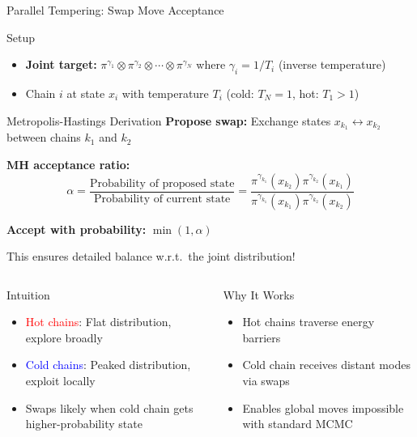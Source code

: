 \documentclass[aspectratio=169]{beamer}
\begin{document}
\begin{frame}{Parallel Tempering: Swap Move Acceptance}

	\begin{block}{Setup}
		\begin{itemize}
			\item \textbf{Joint target:} $\pi^{\gamma_1} \otimes \pi^{\gamma_2} \otimes \cdots \otimes \pi^{\gamma_N}$ where $\gamma_i = 1/T_i$ (inverse temperature)
			\item Chain $i$ at state $x_i$ with temperature $T_i$ (cold: $T_N=1$, hot: $T_1 > 1$)
		\end{itemize}
	\end{block}

	\begin{block}{Metropolis-Hastings Derivation}
		\textbf{Propose swap:} Exchange states $x_{k_1} \leftrightarrow x_{k_2}$ between chains $k_1$ and $k_2$

		\textbf{MH acceptance ratio:}
		$$\alpha = \frac{\text{Probability of proposed state}}{\text{Probability of current state}} = \frac{\pi^{\gamma_{k_1}}(x_{k_2})\pi^{\gamma_{k_2}}(x_{k_1})}{\pi^{\gamma_{k_1}}(x_{k_1})\pi^{\gamma_{k_2}}(x_{k_2})}$$

		\textbf{Accept with probability:} $\min(1, \alpha)$

		This ensures detailed balance w.r.t.\ the joint distribution!
	\end{block}

	\begin{columns}[t]
		\begin{column}{0.48\textwidth}
			\begin{block}{Intuition}
				\begin{itemize}
					\item \textcolor{red}{Hot chains}: Flat distribution, explore broadly
					\item \textcolor{blue}{Cold chains}: Peaked distribution, exploit locally
					\item Swaps likely when cold chain gets higher-probability state
				\end{itemize}
			\end{block}
		\end{column}

		\begin{column}{0.48\textwidth}
			\begin{block}{Why It Works}
				\begin{itemize}
					\item Hot chains traverse energy barriers
					\item Cold chain receives distant modes via swaps
					\item Enables global moves impossible with standard MCMC
				\end{itemize}
			\end{block}
		\end{column}
	\end{columns}

\end{frame}
\end{document}
